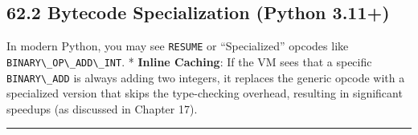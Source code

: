 \hypertarget{bytecode-specialization-python-3.11}{%
\subsection{62.2 Bytecode Specialization (Python
3.11+)}\label{bytecode-specialization-python-3.11}}

In modern Python, you may see \passthrough{\lstinline!RESUME!} or
``Specialized'' opcodes like
\passthrough{\lstinline!BINARY\_OP\_ADD\_INT!}. * \textbf{Inline
Caching}: If the VM sees that a specific
\passthrough{\lstinline!BINARY\_ADD!} is always adding two integers, it
replaces the generic opcode with a specialized version that skips the
type-checking overhead, resulting in significant speedups (as discussed
in Chapter 17).

\begin{center}\rule{0.5\linewidth}{0.5pt}\end{center}
